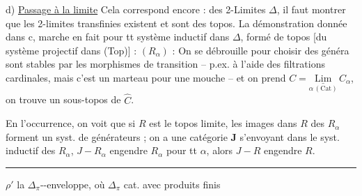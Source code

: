 
d) \uline{Passage à la limite} Cela correspond encore : des 2-Limites   $\Delta$, il faut montrer que les 2-limites transfinies existent et sont des topos. La démonstration donnée dans c, marche en fait pour tt système inductif  dans $\Delta$, formé de topos [du système projectif dans (Top)] : $(R_\alpha)$ : On se débrouille pour choisir des
  généra   sont stables par les morphismes de transition  -- p.ex. à l'aide des filtrations cardinales, mais c'est un marteau pour une mouche -- et on prend  $C=\underset{\alpha\,(\mathrm{Cat})}{\underline{\mathrm{Lim}}}\, C_\alpha$, on  trouve un sous-topos de $\widehat C$.

En l'occurrence,   on voit que si  $R$ est le topos limite,  les images dans $R$ des $R_\alpha$ forment un syst. de générateurs ;   on a une  catégorie $\mathbf J$ s'envoyant dans le syst. inductif des $R_\alpha$, $J-R_\alpha$ engendre $R_\alpha$ pour tt $\alpha$, alors $J-R$ engendre $R$.

\par\noindent\rule{\linewidth}{.3pt}\par


$\rho'$ la $\Delta_\pi$--enveloppe, où $\Delta_\pi$ cat. avec produits finis

